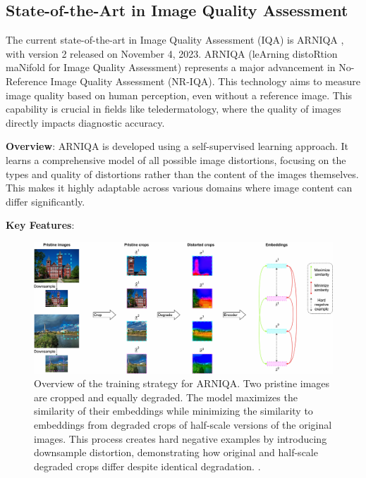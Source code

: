 \subsection{State-of-the-Art in Image Quality Assessment}
\label{sub:SOTA_IQA}
The current state-of-the-art in Image Quality Assessment (IQA) is ARNIQA \autocite{ARNIQA} , with version 2 released on November 4, 2023. ARNIQA (leArning distoRtion maNifold for Image Quality Assessment) represents a major advancement in No-Reference Image Quality Assessment (NR-IQA). This technology aims to measure image quality based on human perception, even without a reference image. This capability is crucial in fields like teledermatology, where the quality of images directly impacts diagnostic accuracy. \par
\vspace{\baselineskip}
\noindent
\textbf{Overview}: ARNIQA is developed using a self-supervised learning approach. It learns a comprehensive model of all possible image distortions, focusing on the types and quality of distortions rather than the content of the images themselves. This makes it highly adaptable across various domains where image content can differ significantly. \par
\vspace{\baselineskip}
\noindent
\textbf{Key Features}:
\begin{figure}[ht]
    \centering
    \includegraphics[keepaspectratio,width=15cm]{img/method_SimCLR.jpg}
    \caption{Overview of the training strategy for ARNIQA. Two pristine images are cropped and equally degraded. The model maximizes the similarity of their embeddings while minimizing the similarity to embeddings from degraded crops of half-scale versions of the original images. This process creates hard negative examples by introducing downsample distortion, demonstrating how original and half-scale degraded crops differ despite identical degradation. \autocite{ARNIQA}.}
    \label{fig:SimCLR}
\end{figure}
